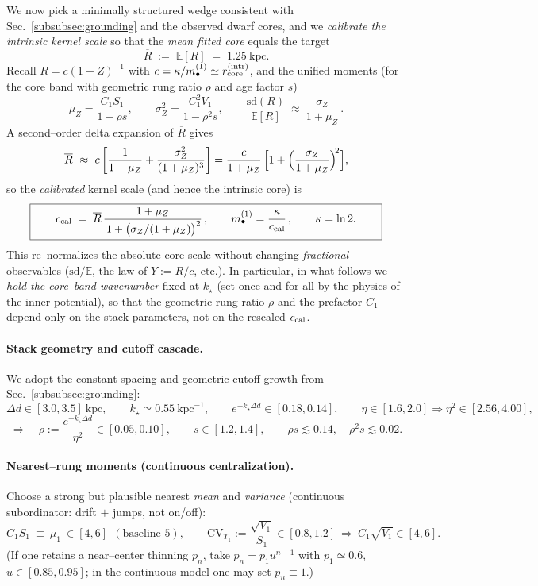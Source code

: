 \documentclass[10pt]{article}
\theoremstyle{definition}
\theoremstyle{plain}
\begin{document}
We now pick a minimally structured wedge consistent with Sec.~\ref{subsubsec:grounding} and the observed dwarf cores, and we \emph{calibrate the intrinsic kernel scale} so that the \emph{mean fitted core} equals the target
\[
\overline{R}\;:=\;\mathbb E[R]\;=\;1.25~\mathrm{kpc}.
\]
Recall $R=c(1+Z)^{-1}$ with $c=\kappa/m_\bullet^{(1)}\simeq r_{\rm core}^{\rm (intr)}$, and the unified moments (for the core band with geometric rung ratio $\rho$ and age factor $s$)
\[
\mu_Z=\frac{C_1S_1}{1-\rho s},\qquad
\sigma_Z^2=\frac{C_1^2V_1}{1-\rho^2 s},\qquad
\frac{\mathrm{sd}(R)}{\mathbb E[R]}\ \approx\ \frac{\sigma_Z}{1+\mu_Z}\,.
\]
A second–order delta expansion of $\overline{R}$ gives
\[
\overline{R}\ \approx\ c\left[\frac{1}{1+\mu_Z}+\frac{\sigma_Z^2}{(1+\mu_Z)^3}\right]
= \frac{c}{1+\mu_Z}\,\Bigl[1+\Bigl(\frac{\sigma_Z}{1+\mu_Z}\Bigr)^{\!2}\Bigr],
\]
so the \emph{calibrated} kernel scale (and hence the intrinsic core) is
\begin{equation}
\boxed{\qquad
c_{\rm cal}\;=\;\overline{R}\,\frac{1+\mu_Z}{\,1+\bigl(\sigma_Z/(1+\mu_Z)\bigr)^{2}}\,,\qquad
m_\bullet^{(1)}=\frac{\kappa}{c_{\rm cal}}\,,\qquad \kappa=\ln 2.
\qquad}
\label{eq:ccal}
\end{equation}
This re–normalizes the absolute core scale without changing \emph{fractional} observables ($\mathrm{sd}/\mathbb E$, the law of $Y:=R/c$, etc.). In particular, in what follows we \emph{hold the core–band wavenumber} fixed at $k_\star$ (set once and for all by the physics of the inner potential), so that the geometric rung ratio $\rho$ and the prefactor $C_1$ depend only on the stack parameters, not on the rescaled $c_{\rm cal}$.

\paragraph{Stack geometry and cutoff cascade.}\label{par:uom-main-186}
We adopt the constant spacing and geometric cutoff growth from Sec.~\ref{subsubsec:grounding}:
\[
\Delta d\in[3.0,3.5]~\mathrm{kpc},\qquad k_\star\simeq 0.55~\mathrm{kpc}^{-1},\qquad 
e^{-k_\star\Delta d}\in[0.18,0.14],\qquad 
\eta\in[1.6,2.0]\Rightarrow \eta^2\in[2.56,4.00],
\]
\[
\Longrightarrow\quad \rho:=\frac{e^{-k_\star\Delta d}}{\eta^2}\in[0.05,0.10],\qquad 
s\in[1.2,1.4],\qquad \rho s\lesssim 0.14,\quad \rho^2 s\lesssim 0.02.
\]

\paragraph{Nearest–rung moments (continuous centralization).}\label{par:uom-main-187}
Choose a strong but plausible nearest \emph{mean} and \emph{variance} (continuous subordinator: drift $+$ jumps, not on/off):
\[
C_1 S_1\ \equiv\ \mu_1\ \in [4,6]\ \ (\text{baseline }5),\qquad
\mathrm{CV}_{\Upsilon_1}:=\frac{\sqrt{V_1}}{S_1}\in[0.8,1.2]\ \Rightarrow\ C_1\sqrt{V_1}\in[4,6].
\]
(If one retains a near–center thinning $p_n$, take $p_n=p_1 u^{n-1}$ with $p_1\simeq 0.6$, $u\in[0.85,0.95]$; in the continuous model one may set $p_n\equiv 1$.)
\end{document}
